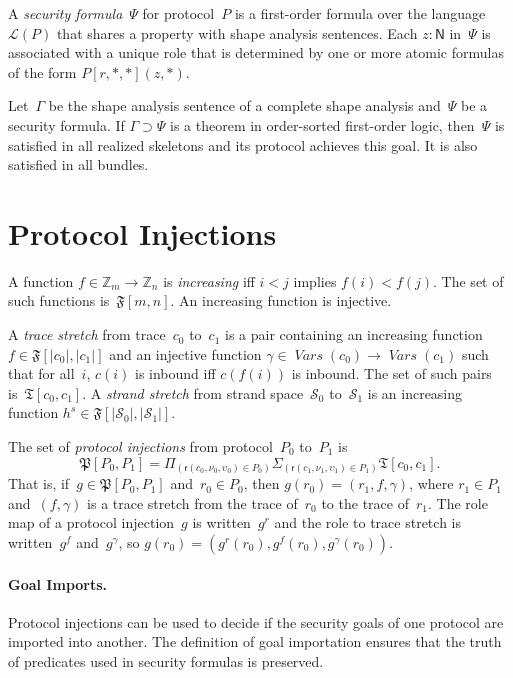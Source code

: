 \documentclass[12pt]{article}
\newcommand{\fn}[1]{\ensuremath{\operatorname{\mathit{#1}}}}
\newcommand{\srt}[1]{\ensuremath{\mathsf{#1}}}
\newcommand{\typ}{\mathbin:}
\newcommand{\vars}{\fn{Vars}}
\newcommand{\zed}{\ensuremath{\mathbb{Z}}}
\newcommand{\dprod}[1]{\Pi_{(#1)}}
\newcommand{\dpair}[1]{\Sigma_{(#1)}}
\newcommand{\alg}[1]{\ensuremath{\mathfrak{#1}}}
\newcommand{\ssp}{\ensuremath{\mathcal{S}}}
\newcommand{\lang}{\mathcal{L}}
\newcommand{\role}{\mathsf{r}}
\begin{document}
A \emph{security formula}~$\Psi$ for protocol~$P$ is a first-order
formula over the language~$\lang(P)$ that shares a property with shape
analysis sentences.  Each $z\typ\srt{N}$ in~$\Psi$ is associated with a
unique role that is determined by one or more atomic formulas of the form
$P[r,\ast,\ast](z,\ast)$.

Let~$\Gamma$ be the shape analysis sentence of a complete shape
analysis and~$\Psi$ be a security formula.  If $\Gamma\supset\Psi$ is a
theorem in order-sorted first-order logic, then~$\Psi$ is satisfied in
all realized skeletons and its protocol achieves this goal.  It is
also satisfied in all bundles.

\section{Protocol Injections}\label{sec:protocol injections}

A function $f\in\zed_m\to\zed_n$ is \emph{increasing} iff $i<j$
implies $f(i)<f(j)$.  The set of such functions is~$\alg{F}[m,n]$.  An
increasing function is injective.

A \emph{trace stretch} from trace~$c_0$ to~$c_1$ is a pair containing
an increasing function $f\in\alg{F}[|c_0|, |c_1|]$ and an injective
function $\gamma\in\vars(c_0)\to\vars(c_1)$ such that for all~$i$,
$c(i)$ is inbound iff $c(f(i))$ is inbound.  The set of such pairs
is~$\alg{T}[c_0,c_1]$.  A \emph{strand stretch} from strand
space~$\ssp_0$ to~$\ssp_1$ is an increasing function
$h^s\in\alg{F}[|\ssp_0|, |\ssp_1|]$.

The set of \emph{protocol injections} from protocol~$P_0$ to~$P_1$ is
\[\alg{P}[P_0,P_1]=\dprod{\role(c_0,\nu_0,\upsilon_0)\in
  P_0}\dpair{\role(c_1,\nu_1,\upsilon_1)\in P_1}\alg{T}[c_0,c_1].\]
That is, if~$g\in\alg{P}[P_0,P_1]$ and~$r_0\in P_0$, then
$g(r_0)=(r_1,f,\gamma)$, where $r_1\in P_1$ and~$(f,\gamma)$ is a
trace stretch from the trace of~$r_0$ to the trace of~$r_1$.  The role
map of a protocol injection~$g$ is written~$g^r$ and the role to trace
stretch is written~$g^f$ and~$g^\gamma$, so $g(r_0)=(g^r(r_0),
g^f(r_0),g^\gamma(r_0))$.

\paragraph{Goal Imports.}
Protocol injections can be used to decide if the security goals of one
protocol are imported into another.  The definition of goal
importation ensures that the truth of predicates used in security
formulas is preserved.
\end{document}

